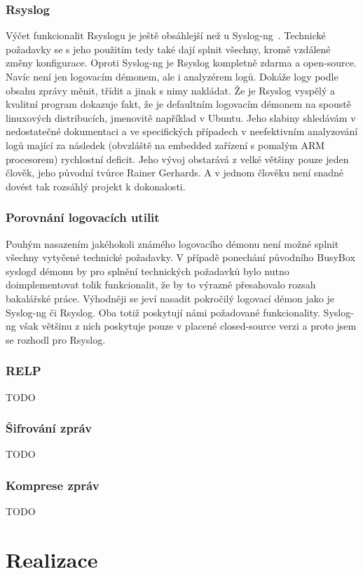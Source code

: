 \documentclass[thesis=B,czech]{FITthesis}[2012/06/26]
\begin{document}
\subsection{Rsyslog}
Výčet funkcionalit Rsyslogu je ještě obsáhlejší než u Syslog-ng~\cite{Rsyslog-features}. Technické požadavky se s jeho použitím tedy také dají splnit všechny, kromě vzdálené změny konfigurace. Oproti Syslog-ng je Rsyslog kompletně zdarma a open-source. Navíc není jen logovacím démonem, ale i analyzérem logů. Dokáže logy podle obsahu zprávy měnit, třídit a jinak s nimy nakládat.
Že je Rsyslog vyspělý a kvalitní program dokazuje fakt, že je defaultním logovacím démonem na spoustě linuxových distribucích, jmenovitě například v Ubuntu.
Jeho slabiny shledávám v nedostatečné dokumentaci a ve specifických případech v neefektivním analyzování logů mající za následek (obvzláště na embedded zařízení s pomalým ARM procesorem) rychlostní deficit. Jeho vývoj obstarává z velké většiny pouze jeden člověk, jeho původní tvůrce Rainer Gerhards. A v jednom člověku není snadné dovést tak rozsáhlý projekt k dokonalosti.

\subsection{Porovnání logovacích utilit}
Pouhým nasazením jakéhokoli známého logovacího démonu není možné splnit všechny vytyčené technické požadavky. V případě ponechání původního BusyBox syslogd démonu by pro splnění technických požadavků bylo nutno doimplementovat tolik funkcionalit, že by to výrazně přesahovalo rozsah bakalářské práce.
Výhodněji se jeví nasadit pokročilý logovací démon jako je Syslog-ng či Rsyslog. Oba totiž poskytují námi požadované funkcionality. Syslog-ng však většinu z nich poskytuje pouze v placené closed-source verzi a proto jsem se rozhodl pro Rsyslog.


\subsection{RELP}
TODO
\subsection{Šifrování zpráv}
TODO
\subsection{Komprese zpráv}
TODO


\chapter{Realizace}
\end{document}
